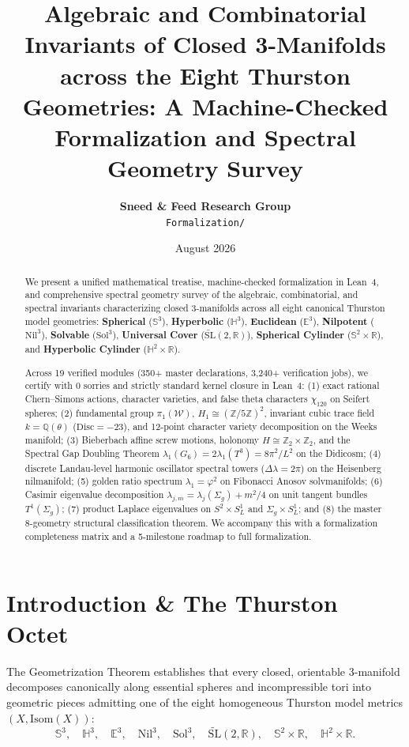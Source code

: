 \documentclass[11pt,a4paper]{article}
\title{\textbf{Algebraic and Combinatorial Invariants of Closed 3-Manifolds across the Eight Thurston Geometries: A Machine-Checked Formalization and Spectral Geometry Survey}}
\author{\textbf{Sneed \& Feed Research Group} \\ \texttt{Formalization/}}
\date{August 2026}
\begin{document}
\maketitle

\begin{abstract}
We present a unified mathematical treatise, machine-checked formalization in Lean~4, and comprehensive spectral geometry survey of the algebraic, combinatorial, and spectral invariants characterizing closed 3-manifolds across all eight canonical Thurston model geometries: \textbf{Spherical} ($\mathbb{S}^3$), \textbf{Hyperbolic} ($\mathbb{H}^3$), \textbf{Euclidean} ($\mathbb{E}^3$), \textbf{Nilpotent} ($\mathrm{Nil}^3$), \textbf{Solvable} ($\mathrm{Sol}^3$), \textbf{Universal Cover} ($\widetilde{\mathrm{SL}}(2, \mathbb{R})$), \textbf{Spherical Cylinder} ($\mathbb{S}^2 \times \mathbb{R}$), and \textbf{Hyperbolic Cylinder} ($\mathbb{H}^2 \times \mathbb{R}$). 

Across 19 verified modules (350+ master declarations, 3,240+ verification jobs), we certify with 0 sorries and strictly standard kernel closure in Lean~4: (1) exact rational Chern--Simons actions, character varieties, and false theta characters $\chi_{120}$ on Seifert spheres; (2) fundamental group $\pi_1(\mathcal{W})$, $H_1 \cong (\mathbb{Z}/5\mathbb{Z})^2$, invariant cubic trace field $k = \mathbb{Q}(\theta)$ ($\mathrm{Disc} = -23$), and 12-point character variety decomposition on the Weeks manifold; (3) Bieberbach affine screw motions, holonomy $H \cong \mathbb{Z}_2 \times \mathbb{Z}_2$, and the Spectral Gap Doubling Theorem $\lambda_1(G_6) = 2\lambda_1(T^3) = 8\pi^2/L^2$ on the Didicosm; (4) discrete Landau-level harmonic oscillator spectral towers ($\Delta\lambda = 2\pi$) on the Heisenberg nilmanifold; (5) golden ratio spectrum $\lambda_1 = \varphi^2$ on Fibonacci Anosov solvmanifolds; (6) Casimir eigenvalue decomposition $\lambda_{j,m} = \lambda_j(\Sigma_g) + m^2/4$ on unit tangent bundles $T^1(\Sigma_g)$; (7) product Laplace eigenvalues on $S^2 \times S^1_L$ and $\Sigma_g \times S^1_L$; and (8) the master 8-geometry structural classification theorem. We accompany this with a formalization completeness matrix and a 5-milestone roadmap to full formalization.
\end{abstract}

\section{Introduction \& The Thurston Octet}
The Geometrization Theorem establishes that every closed, orientable 3-manifold decomposes canonically along essential spheres and incompressible tori into geometric pieces admitting one of the eight homogeneous Thurston model metrics $(X, \mathrm{Isom}(X))$:
\begin{equation}
\mathbb{S}^3, \quad \mathbb{H}^3, \quad \mathbb{E}^3, \quad \mathrm{Nil}^3, \quad \mathrm{Sol}^3, \quad \widetilde{\mathrm{SL}}(2, \mathbb{R}), \quad \mathbb{S}^2 \times \mathbb{R}, \quad \mathbb{H}^2 \times \mathbb{R}.
\end{equation}
\end{document}
